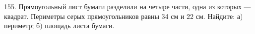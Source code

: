 155. Прямоугольный лист бумаги разделили на четыре части, одна из которых --- квадрат. Периметры серых прямоугольников равны 34 см и 22 см. Найдите: а) периметр; б) площадь листа бумаги.
\begin{center}
\begin{figure}[ht!]
\end{figure}
\end{center}\newpage\noindent

